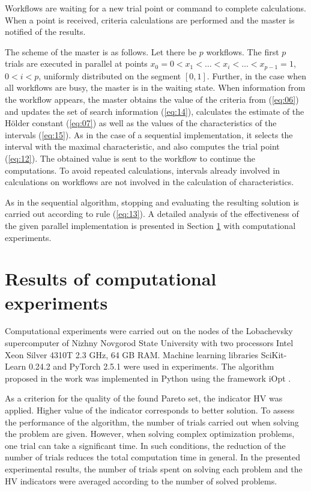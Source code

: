 \documentclass[runningheads]{llncs}
\begin{document}
Workflows are waiting for a new trial point or command to complete calculations. When a point is received, criteria calculations are performed and the master is notified of the results. 

The scheme of the master is as follows. Let there be $p$ workflows. The first $p$ trials are executed in parallel at points $x_0=0<x_1<\dots<x_i<\dots<x_{p-1}=1$, $0<i<p$, uniformly distributed on the segment $[0,1]$. Further, in the case when all workflows are busy, the master is in the waiting state. When information from the workflow appears, the master obtains the value of the criteria from (\ref{eq:06}) and updates the set of search information (\ref{eq:14}), calculates the estimate of the H{\" o}lder constant (\ref{eq:07}) as well as the values of the characteristics of the intervals (\ref{eq:15}). As in the case of a sequential implementation, it selects the interval with the maximal characteristic, and also computes the trial point (\ref{eq:12}). The obtained value is sent to the workflow to continue the computations. To avoid repeated calculations, intervals already involved in calculations on workflows are not involved in the calculation of characteristics.

As in the sequential algorithm, stopping and evaluating the resulting solution is carried out according to rule (\ref{eq:13}). A detailed analysis of the effectiveness of the given parallel implementation is presented in Section \ref{sec4} with computational experiments.


\section{Results of computational experiments}
\label{sec4}

Computational experiments were carried out on the nodes of the Lobachevsky supercomputer of Nizhny Novgorod State University with two processors Intel Xeon Silver 4310T 2.3 GHz, 64 GB RAM. Machine learning libraries SciKit-Learn 0.24.2 \cite{scikit-learn} and PyTorch 2.5.1 \cite{PyTorch} were used in experiments. The algorithm proposed in the work was implemented in Python using the framework iOpt \cite{ioptmco}.

As a criterion for the quality of the found Pareto set, the indicator HV \cite{Evtushenko2014,pymoo,AGP_ML} was applied. Higher value of the indicator corresponds to better solution. To assess the performance of the algorithm, the number of trials carried out when solving the problem are given. However, when solving complex optimization problems, one trial can take a significant time. In such conditions, the reduction of the number of trials reduces the total computation time in general. In the presented experimental results, the number of trials spent on solving each problem and the HV indicators were averaged according to the number of solved problems.
\end{document}
